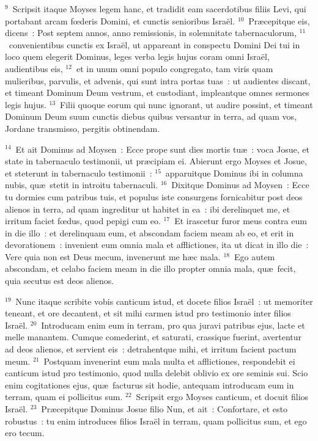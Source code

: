 ${}^{9}$~Scripsit itaque Moyses legem hanc, et tradidit eam sacerdotibus filiis Levi, qui portabant arcam fœderis Domini, et cunctis senioribus Isra\"el.
${}^{10}$~Pr\ae cepitque eis, dicens~: Post septem annos, anno remissionis, in solemnitate tabernaculorum,
${}^{11}$~convenientibus cunctis ex Isra\"el, ut appareant in conspectu Domini Dei tui in loco quem elegerit Dominus, leges verba legis hujus coram omni Isra\"el, audientibus eis,
${}^{12}$~et in unum omni populo congregato, tam viris quam mulieribus, parvulis, et advenis, qui sunt intra portas tuas~: ut audientes discant, et timeant Dominum Deum vestrum, et custodiant, impleantque omnes sermones legis hujus.
${}^{13}$~Filii quoque eorum qui nunc ignorant, ut audire possint, et timeant Dominum Deum suum cunctis diebus quibus versantur in terra, ad quam vos, Jordane transmisso, pergitis obtinendam.


${}^{14}$~Et ait Dominus ad Moysen~: Ecce prope sunt dies mortis tu\ae~: voca Josue, et state in tabernaculo testimonii, ut pr\ae cipiam ei. Abierunt ergo Moyses et Josue, et steterunt in tabernaculo testimonii~:
${}^{15}$~apparuitque Dominus ibi in columna nubis, qu\ae\ stetit in introitu tabernaculi.
${}^{16}$~Dixitque Dominus ad Moysen~: Ecce tu dormies cum patribus tuis, et populus iste consurgens fornicabitur post deos alienos in terra, ad quam ingreditur ut habitet in ea~: ibi derelinquet me, et irritum faciet fœdus, quod pepigi cum eo.
${}^{17}$~Et irascetur furor meus contra eum in die illo~: et derelinquam eum, et abscondam faciem meam ab eo, et erit in devorationem~: invenient eum omnia mala et afflictiones, ita ut dicat in illo die~: Vere quia non est Deus mecum, invenerunt me h\ae c mala.
${}^{18}$~Ego autem abscondam, et celabo faciem meam in die illo propter omnia mala, qu\ae\ fecit, quia secutus est deos alienos.


${}^{19}$~Nunc itaque scribite vobis canticum istud, et docete filios Isra\"el~: ut memoriter teneant, et ore decantent, et sit mihi carmen istud pro testimonio inter filios Isra\"el.
${}^{20}$~Introducam enim eum in terram, pro qua juravi patribus ejus, lacte et melle manantem. Cumque comederint, et saturati, crassique fuerint, avertentur ad deos alienos, et servient eis~: detrahentque mihi, et irritum facient pactum meum.
${}^{21}$~Postquam invenerint eum mala multa et afflictiones, respondebit ei canticum istud pro testimonio, quod nulla delebit oblivio ex ore seminis sui. Scio enim cogitationes ejus, qu\ae\ facturus sit hodie, antequam introducam eum in terram, quam ei pollicitus sum.
${}^{22}$~Scripsit ergo Moyses canticum, et docuit filios Isra\"el.
${}^{23}$~Pr\ae cepitque Dominus Josue filio Nun, et ait~: Confortare, et esto robustus~: tu enim introduces filios Isra\"el in terram, quam pollicitus sum, et ego ero tecum.


